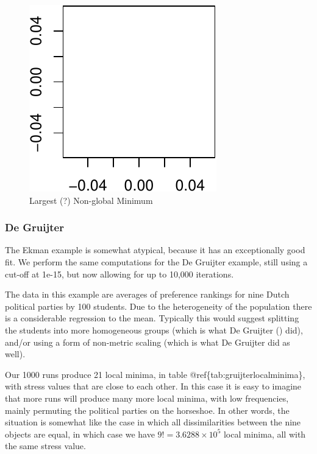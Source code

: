 \documentclass[
  12pt,
  letterpaper,
  DIV=11,
  numbers=noendperiod]{scrreprt}
\theoremstyle{remark}
\begin{document}
\begin{figure}[H]

{\centering \includegraphics{global_files/figure-pdf/ekmanlmplot2-1.pdf}

}

\caption{Largest (?) Non-global Minimum}

\end{figure}%

\subsubsection{De Gruijter}\label{de-gruijter}

The Ekman example is somewhat atypical, because it has an exceptionally
good fit. We perform the same computations for the De Gruijter example,
still using a cut-off at 1e-15, but now allowing for up to 10,000
iterations.

The data in this example are averages of preference rankings for nine
Dutch political parties by 100 students. Due to the heterogeneity of the
population there is a considerable regression to the mean. Typically
this would suggest splitting the students into more homogeneous groups
(which is what De Gruijter () did),
and/or using a form of non-metric scaling (which is what De Gruijter did
as well).

Our 1000 runs produce 21 local minima, in table
@ref\{tab:gruijterlocalminima\}, with stress values that are close to
each other. In this case it is easy to imagine that more runs will
produce many more local minima, with low frequencies, mainly permuting
the political parties on the horseshoe. In other words, the situation is
somewhat like the case in which all dissimilarities between the nine
objects are equal, in which case we have
\(9!=\)\ensuremath{3.6288\times 10^{5}} local minima, all with the same
stress value.
\end{document}
